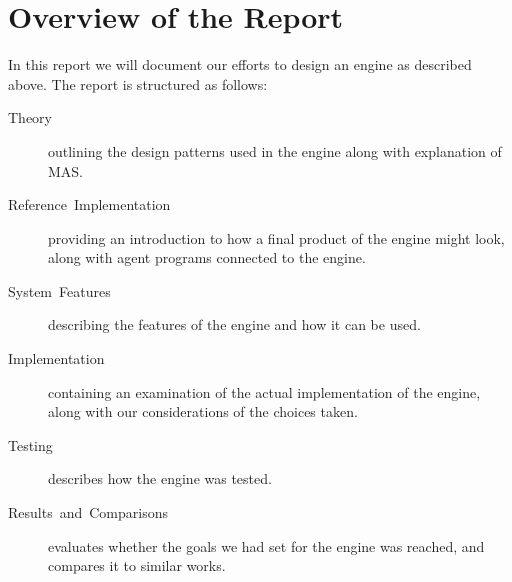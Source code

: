 \section*{Overview of the Report}

In this report we will document our efforts to design an engine as
described above. The report is structured as follows: 
\begin{description}
\item [{Theory}] outlining the design patterns used in the engine along
with explanation of MAS.
\item [{Reference~Implementation}] providing an introduction to how a
final product of the engine might look, along with agent programs
connected to the engine.
\item [{System~Features}] describing the features of the engine and how
it can be used.
\item [{Implementation}] containing an examination of the actual implementation
of the engine, along with our considerations of the choices taken.
\item [{Testing}] describes how the engine was tested.
\item [{Results~and~Comparisons}] evaluates whether the goals we had
set for the engine was reached, and compares it to similar works.\end{description}

